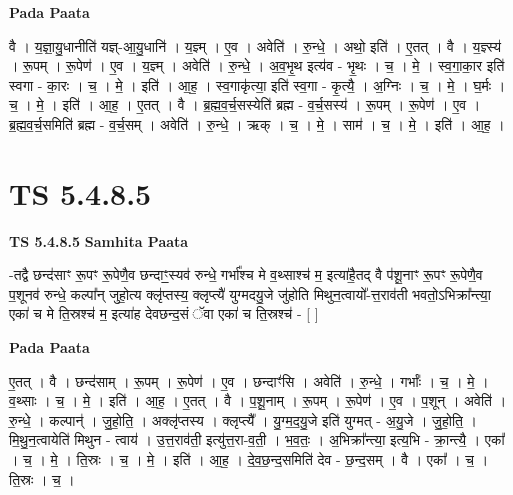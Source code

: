\documentclass[17pt]{extarticle}
\begin{document}
\textbf{Pada Paata} \newline

वै । य॒ज्ञा॒यु॒धानीति॑ यज्ञ्-आ॒यु॒धानि॑ । य॒ज्ञ्म् । ए॒व । अवेति॑ । रु॒न्धे॒ । अथो॒ इति॑ । ए॒तत् । वै । य॒ज्ञ्स्य॑ । रू॒पम् । रू॒पेण॑ । ए॒व । य॒ज्ञ्म् । अवेति॑ । रु॒न्धे॒ । अ॒व॒भृ॒थ इत्य॑व - भृ॒थः । च॒ । मे॒ । स्व॒गा॒का॒र इति॑ स्वगा - का॒रः । च॒ । मे॒ । इति॑ । आ॒ह॒ । स्व॒गाकृ॑त्या॒ इति॑ स्व॒गा - कृ॒त्यै॒ । अ॒ग्निः । च॒ । मे॒ । घ॒र्मः । च॒ । मे॒ । इति॑ । आ॒ह॒ । ए॒तत् । वै । ब्र॒ह्म॒व॒र्च॒सस्येति॑ ब्रह्म - व॒र्च॒सस्य॑ । रू॒पम् । रू॒पेण॑ । ए॒व । ब्र॒ह्म॒व॒र्च॒समिति॑ ब्रह्म - व॒र्च॒सम् । अवेति॑ । रु॒न्धे॒ । ऋक् । च॒ । मे॒ । साम॑ । च॒ । मे॒ । इति॑ । आ॒ह॒ ।  \newline





\section{ TS 5.4.8.5 }

\textbf{TS 5.4.8.5 } \newline
\textbf{Samhita Paata} \newline

-तद्वै छन्द॑साꣳ रू॒पꣳ रू॒पेणै॒व छन्दाꣳ॒॒स्यव॑ रुन्धे॒ गर्भा᳚श्च मे व॒थ्साश्च॑ म॒ इत्या॑है॒तद् वै प॑शू॒नाꣳ रू॒पꣳ रू॒पेणै॒व प॒शूनव॑ रुन्धे॒ कल्पा᳚न् जुहो॒त्य क्लृ॑प्तस्य॒ क्लृप्त्यै॑ युग्मदयु॒जे जु॑होति मिथुन॒त्वायो᳚-त्त॒राव॑ती भवतो॒ऽभिक्रा᳚न्त्या॒ एका॑ च मे ति॒स्रश्च॑ म॒ इत्या॑ह देवछन्द॒सं ॅवा एका॑ च ति॒स्रश्च॑ - [  ] \newline

\textbf{Pada Paata} \newline

ए॒तत् । वै । छन्द॑साम् । रू॒पम् । रू॒पेण॑ । ए॒व । छन्दाꣳ॑सि । अवेति॑ । रु॒न्धे॒ । गर्भाः᳚ । च॒ । मे॒ । व॒थ्साः । च॒ । मे॒ । इति॑ । आ॒ह॒ । ए॒तत् । वै । प॒शू॒नाम् । रू॒पम् । रू॒पेण॑ । ए॒व । प॒शून् । अवेति॑ । रु॒न्धे॒ । कल्पान्॑ । जु॒हो॒ति॒ । अक्लृ॑प्तस्य । क्लृप्त्यै᳚ । यु॒ग्म॒द॒यु॒जे इति॑ युग्मत् - अ॒यु॒जे । जु॒हो॒ति॒ । मि॒थु॒न॒त्वायेति॑ मिथुन - त्वाय॑ । उ॒त्त॒राव॑ती॒ इत्यु॑त्त॒रा-व॒ती॒ । भ॒व॒तः॒ । अ॒भिक्रा᳚न्त्या॒ इत्य॒भि - क्रा॒न्त्यै॒ । एका᳚ । च॒ । मे॒ । ति॒स्रः । च॒ । मे॒ । इति॑ । आ॒ह॒ । दे॒व॒छ॒न्द॒समिति॑ देव - छ॒न्द॒सम् । वै । एका᳚ । च॒ । ति॒स्रः । च॒ ।  \newline




\end{document}
